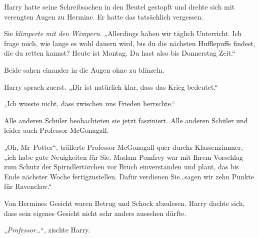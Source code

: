 Harry hatte seine Schreibsachen in den Beutel gestopft und drehte sich mit verengten Augen zu Hermine. Er hatte das tatsächlich vergessen.

Sie \emph{klimperte mit den Wimpern.} „Allerdings haben wir täglich Unterricht. Ich frage mich, wie lange es wohl dauern wird, bis du die nächsten Hufflepuffs findest, die du retten kannst? Heute ist Montag. Du hast also bis Donnerstag Zeit.“

Beide sahen einander in die Augen ohne zu blinzeln.

Harry sprach zuerst. „Dir ist natürlich klar, dass das Krieg bedeutet.“

„Ich wusste nicht, dass zwischen uns Frieden herrschte.“

Alle anderen Schüler beobachteten sie jetzt fasziniert. Alle anderen Schüler und leider auch Professor McGonagall.

„Oh, Mr~Potter“, trällerte Professor McGonagall quer durchs Klassenzimmer, „ich habe gute Neuigkeiten für Sie. Madam Pomfrey war mit Ihrem Vorschlag zum Schutz der Spirndlertörchen vor Bruch einverstanden und plant, das bis Ende nächster Woche fertigzustellen. Dafür verdienen Sie…sagen wir zehn Punkte für Ravenclaw.“

Von Hermines Gesicht waren Betrug und Schock abzulesen. Harry dachte sich, dass sein eigenes Gesicht nicht sehr anders aussehen dürfte.

„\emph{Professor…}“, zischte Harry.

